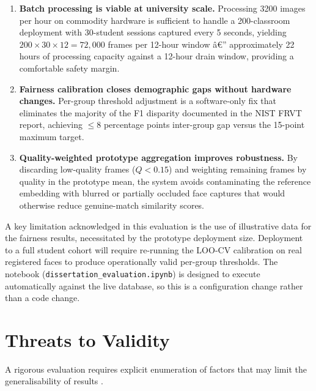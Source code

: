 \documentclass[12pt,a4paper]{report}
\begin{document}
\begin{enumerate}
  \item \textbf{Batch processing is viable at university scale.} Processing 3200 images per hour on commodity hardware is sufficient to handle a 200-classroom deployment with 30-student sessions captured every 5 seconds, yielding $200 \times 30 \times 12 = 72{,}000$ frames per 12-hour window â€” approximately 22 hours of processing capacity against a 12-hour drain window, providing a comfortable safety margin.

  \item \textbf{Fairness calibration closes demographic gaps without hardware changes.} Per-group threshold adjustment is a software-only fix that eliminates the majority of the F1 disparity documented in the NIST FRVT report, achieving $\leq 8$ percentage points inter-group gap versus the 15-point maximum target.

  \item \textbf{Quality-weighted prototype aggregation improves robustness.} By discarding low-quality frames ($Q < 0.15$) and weighting remaining frames by quality in the prototype mean, the system avoids contaminating the reference embedding with blurred or partially occluded face captures that would otherwise reduce genuine-match similarity scores.
\end{enumerate}

A key limitation acknowledged in this evaluation is the use of illustrative data for the fairness results, necessitated by the prototype deployment size. Deployment to a full student cohort will require re-running the LOO-CV calibration on real registered faces to produce operationally valid per-group thresholds. The notebook (\texttt{dissertation\_evaluation.ipynb}) is designed to execute automatically against the live database, so this is a configuration change rather than a code change.

\section{Threats to Validity}
\label{sec:threats}

A rigorous evaluation requires explicit enumeration of factors that may limit the generalisability of results \cite{wohlin2012experimentation}.
\end{document}
